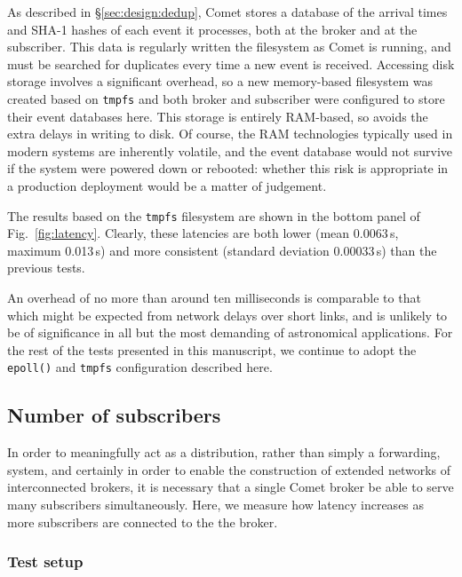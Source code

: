 \documentclass[5p,authoryear]{elsarticle}
\begin{document}
%
%
As described in \S\ref{sec:design:dedup}, Comet stores a database of the
arrival times and SHA-1 hashes of each event it processes, both at the broker
and at the subscriber. This data is regularly written the filesystem as Comet
is running, and must be searched for duplicates every time a new event is
received. Accessing disk storage involves a significant overhead, so a new
memory-based filesystem was created based on \texttt{tmpfs}
\citep{Kerrisk:2014} and both broker and subscriber were configured to store
their event databases here. This storage is entirely RAM-based, so avoids the
extra delays in writing to disk. Of course, the RAM technologies typically
used in modern systems are inherently volatile, and the event database would
not survive if the system were powered down or rebooted: whether this risk is
appropriate in a production deployment would be a matter of judgement.

The results based on the \texttt{tmpfs} filesystem are shown in the bottom
panel of Fig.~\ref{fig:latency}. Clearly, these latencies are both lower (mean
0.0063\,s, maximum 0.013\,s) and more consistent (standard deviation
0.00033\,s) than the previous tests.

An overhead of no more than around ten milliseconds is comparable to that
which might be expected from network delays over short links, and is unlikely
to be of significance in all but the most demanding of astronomical
applications. For the rest of the tests presented in this manuscript, we
continue to adopt the \texttt{epoll()} and \texttt{tmpfs} configuration
described here.

\subsection{Number of subscribers}

In order to meaningfully act as a distribution, rather than simply a
forwarding, system, and certainly in order to enable the construction of
extended networks of interconnected brokers, it is necessary that a single
Comet broker be able to serve many subscribers simultaneously. Here, we
measure how latency increases as more subscribers are connected to the the
broker.

\subsubsection{Test setup}
\end{document}
